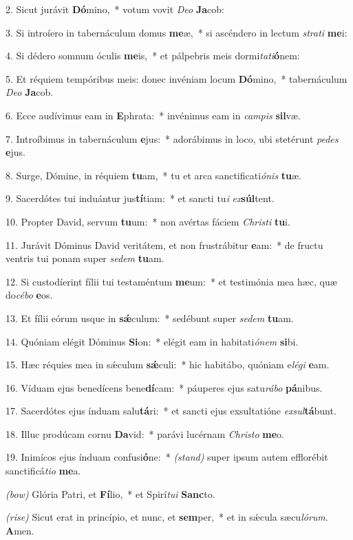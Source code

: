 2. Sicut jurávit \textbf{Dó}mino,~* votum vovit \textit{De}\textit{o} \textbf{Ja}cob:

3. Si introíero in tabernáculum domus \textbf{me}æ,~* si ascéndero in lectum \textit{stra}\textit{ti} \textbf{me}i:

4. Si dédero somnum óculis \textbf{me}is,~* et pálpebris meis dormi\textit{ta}\textit{ti}\textbf{ó}nem:

5. Et réquiem tempóribus meis: donec invéniam locum \textbf{Dó}mino,~* tabernáculum \textit{De}\textit{o} \textbf{Ja}cob.

6. Ecce audívimus eam in \textbf{E}phrata:~* invénimus eam in \textit{cam}\textit{pis} \textbf{sil}væ.

7. Introíbimus in tabernáculum \textbf{e}jus:~* adorábimus in loco, ubi stetérunt \textit{pe}\textit{des} \textbf{e}jus.

8. Surge, Dómine, in réquiem \textbf{tu}am,~* tu et arca sanctificati\textit{ó}\textit{nis} \textbf{tu}æ.

9. Sacerdótes tui induántur jus\textbf{tí}tiam:~* et sancti tu\textit{i} \textit{ex}\textbf{súl}tent.

10. Propter David, servum \textbf{tu}um:~* non avértas fáciem \textit{Chris}\textit{ti} \textbf{tu}i.

11. Jurávit Dóminus David veritátem, et non frustrábitur \textbf{e}am:~* de fructu ventris tui ponam super \textit{se}\textit{dem} \textbf{tu}am.

12. Si custodíerint fílii tui testaméntum \textbf{me}um:~* et testimónia mea hæc, quæ do\textit{cé}\textit{bo} \textbf{e}os.

13. Et fílii eórum usque in \textbf{s\'{\ae}}culum:~* sedébunt super \textit{se}\textit{dem} \textbf{tu}am.

14. Quóniam elégit Dóminus \textbf{Si}on:~* elégit eam in habitati\textit{ó}\textit{nem} \textbf{si}bi.

15. Hæc réquies mea in s\'{\ae}culum \textbf{s\'{\ae}}culi:~* hic habitábo, quóniam e\textit{lé}\textit{gi} \textbf{e}am.

16. Víduam ejus benedícens bene\textbf{dí}cam:~* páuperes ejus satu\textit{rá}\textit{bo} \textbf{pá}nibus.

17. Sacerdótes ejus índuam salu\textbf{tá}ri:~* et sancti ejus exsultatióne \textit{ex}\textit{sul}\textbf{tá}bunt.

18. Illuc prodúcam cornu \textbf{Da}vid:~* parávi lucérnam \textit{Chris}\textit{to} \textbf{me}o.

19. Inimícos ejus índuam confusi\textbf{ó}ne:~* {\color{red}\textit{(stand)}} super ipsum autem efflorébit sanctificá\textit{ti}\textit{o} \textbf{me}a.

{\color{red}\textit{(bow)}} Glória Patri, et \textbf{Fí}lio,~* et Spirí\textit{tu}\textit{i} \textbf{Sanc}to.

{\color{red}\textit{(rise)}} Sicut erat in princípio, et nunc, et \textbf{sem}per,~* et in s\'{\ae}cula sæcu\textit{ló}\textit{rum}. \textbf{A}men.